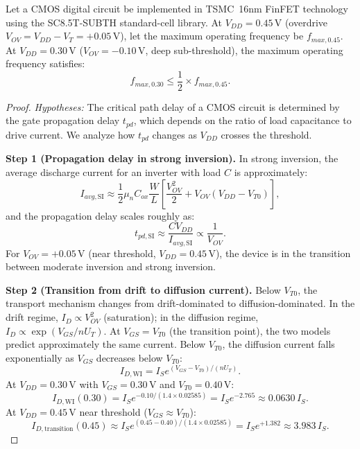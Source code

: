 \begin{theorem}
\label{thm:freq_derating}
Let a CMOS digital circuit be implemented in TSMC~16nm FinFET technology using the
SC8.5T-SUBTH standard-cell library.  At $V_{DD} = 0.45\,\text{V}$ (overdrive
$V_{OV} = V_{DD} - V_T = +0.05\,\text{V}$), let the maximum operating frequency be
$f_{max,0.45}$.  At $V_{DD} = 0.30\,\text{V}$ ($V_{OV} = -0.10\,\text{V}$, deep
sub-threshold), the maximum operating frequency satisfies:
\[
  f_{max,0.30} \leq \frac{1}{2} \times f_{max,0.45}.
\]
\end{theorem}

\begin{proof}
\emph{Hypotheses:} The critical path delay of a CMOS circuit is determined by the
gate propagation delay $t_{pd}$, which depends on the ratio of load capacitance to drive
current.  We analyze how $t_{pd}$ changes as $V_{DD}$ crosses the threshold.

\textbf{Step 1 (Propagation delay in strong inversion).}
In strong inversion, the average discharge current for an inverter with load $C$ is
approximately:
\[
  I_{avg,\text{SI}} \approx \frac{1}{2} \mu_n C_{ox} \frac{W}{L}
  \left[\frac{V_{OV}^2}{2} + V_{OV}(V_{DD} - V_{T0}) \right],
\]
and the propagation delay scales roughly as:
\[
  t_{pd,\text{SI}} \approx \frac{C V_{DD}}{I_{avg,\text{SI}}} \propto \frac{1}{V_{OV}}.
\]
For $V_{OV} = +0.05\,\text{V}$ (near threshold, $V_{DD} = 0.45\,\text{V}$), the device
is in the transition between moderate inversion and strong inversion.

\textbf{Step 2 (Transition from drift to diffusion current).}
Below $V_{T0}$, the transport mechanism changes from drift-dominated to diffusion-dominated.
In the drift regime, $I_D \propto V_{OV}^2$ (saturation); in the diffusion regime,
$I_D \propto \exp(V_{GS}/n U_T)$.  At $V_{GS} = V_{T0}$ (the transition point), the two
models predict approximately the same current.  Below $V_{T0}$, the diffusion current falls
exponentially as $V_{GS}$ decreases below $V_{T0}$:
\[
  I_{D,\text{WI}} = I_S e^{(V_{GS}-V_{T0})/(n U_T)}.
\]
At $V_{DD} = 0.30\,\text{V}$ with $V_{GS} = 0.30\,\text{V}$ and $V_{T0} = 0.40\,\text{V}$:
\[
  I_{D,\text{WI}}(0.30) = I_S e^{-0.10/(1.4 \times 0.02585)} = I_S e^{-2.765} \approx 0.0630 \, I_S.
\]
At $V_{DD} = 0.45\,\text{V}$ near threshold ($V_{GS} \approx V_{T0}$):
\[
  I_{D,\text{transition}}(0.45) \approx I_S e^{(0.45 - 0.40)/(1.4 \times 0.02585)}
  = I_S e^{+1.382} \approx 3.983 \, I_S.
\]


\end{proof}
